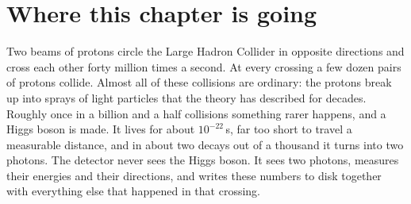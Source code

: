\providecommand{\FourBScPfourTh}{}\renewcommand{\FourBScPfourTh}{0.0228}
\providecommand{\FourBScPthreeGlob}{}\renewcommand{\FourBScPthreeGlob}{0.040}
\providecommand{\FourBScTrialsThreeAsym}{}\renewcommand{\FourBScTrialsThreeAsym}{28}
\providecommand{\HyyNData}{}\renewcommand{\HyyNData}{76394}
\providecommand{\HyyNCat}{}\renewcommand{\HyyNCat}{8582}
\providecommand{\HyyNTrig}{}\renewcommand{\HyyNTrig}{7798424}
\providecommand{\HyyNTwo}{}\renewcommand{\HyyNTwo}{979404}
\providecommand{\HyyNIso}{}\renewcommand{\HyyNIso}{362972}
\providecommand{\HyyNKin}{}\renewcommand{\HyyNKin}{322243}
\providecommand{\HyyNAll}{}\renewcommand{\HyyNAll}{7798424}
\providecommand{\HyySigExp}{}\renewcommand{\HyySigExp}{397.9}
\providecommand{\HyySigCat}{}\renewcommand{\HyySigCat}{58.8}
\providecommand{\HyySigTrig}{}\renewcommand{\HyySigTrig}{610.9}
\providecommand{\HyySigTwo}{}\renewcommand{\HyySigTwo}{485.2}
\providecommand{\HyySigIso}{}\renewcommand{\HyySigIso}{430}
\providecommand{\HyySigKin}{}\renewcommand{\HyySigKin}{398.1}
\providecommand{\HyySigAll}{}\renewcommand{\HyySigAll}{610.9}
\providecommand{\HyyEffSig}{}\renewcommand{\HyyEffSig}{0.651}
\providecommand{\HyyRelSyst}{}\renewcommand{\HyyRelSyst}{0.0086}
\providecommand{\HyyNA}{}\renewcommand{\HyyNA}{4227}
\providecommand{\HyyNB}{}\renewcommand{\HyyNB}{14804}
\providecommand{\HyyNC}{}\renewcommand{\HyyNC}{21876}
\providecommand{\HyyND}{}\renewcommand{\HyyND}{35487}
\providecommand{\HyySigggH}{}\renewcommand{\HyySigggH}{357.2}
\providecommand{\HyySigVBF}{}\renewcommand{\HyySigVBF}{29.9}
\providecommand{\HyySigWH}{}\renewcommand{\HyySigWH}{5.6}
\providecommand{\HyySigZH}{}\renewcommand{\HyySigZH}{5.3}
 
\section*{Where this chapter is going}
\label{T4a:sec:roadmap}

Two beams of protons circle the Large Hadron Collider in opposite directions and cross each other forty million times a second. At every crossing a few dozen pairs of protons collide. Almost all of these collisions are ordinary: the protons break up into sprays of light particles that the theory has described for decades. Roughly once in a billion and a half collisions something rarer happens, and a Higgs boson is made. It lives for about $10^{-22}$\,s, far too short to travel a measurable distance, and in about two decays out of a thousand it turns into two photons. The detector never sees the Higgs boson. It sees two photons, measures their energies and their directions, and writes these numbers to disk together with everything else that happened in that crossing.

